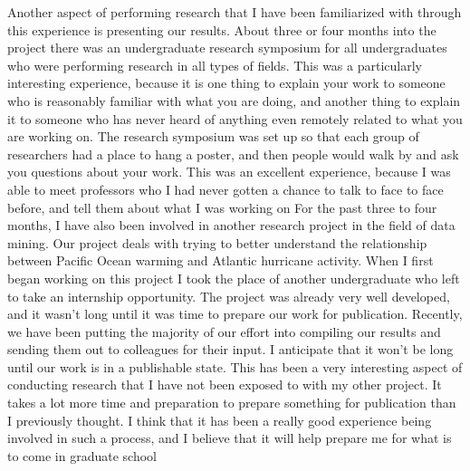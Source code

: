 \documentclass[a4paper,12pt]{article}
\newcommand{\tab}{\hspace*{2em}}
\begin{document}
\tab Another aspect of performing research that I have been familiarized with through this experience is presenting our results.  About three or four months into the project there was an undergraduate research symposium for all undergraduates who were performing research in all types of fields.  This was a particularly interesting experience, because it is one thing to explain your work to someone who is reasonably familiar with what you are doing, and another thing to explain it to someone who has never heard of anything even remotely related to what you are working on.  The research symposium was set up so that each group of researchers had a place to hang a poster, and then people would walk by and ask you questions about your work.  This was an excellent experience, because I was able to meet professors who I had never gotten a chance to talk to face to face before, and tell them about what I was working on\newline
\tab For the past three to four months, I have also been involved in another research project in the field of data mining.  Our project deals with trying to better understand the relationship between Pacific Ocean warming and Atlantic hurricane activity.  When I first began working on this project I took the place of another undergraduate who left to take an internship opportunity.  The project was already very well developed, and it wasn't long until it was time to prepare our work for publication.  Recently, we have been putting the majority of our effort into compiling our results and sending them out to colleagues for their input.  I anticipate that it won't be long until our work is in a publishable state.  This has been a very interesting aspect of conducting research that I have not been exposed to with my other project.  It takes a lot more time and preparation to prepare something for publication than I previously thought.  I think that it has been a really good experience being involved in such a process, and I believe that it will help prepare me for what is to come in graduate school
\end{document}
